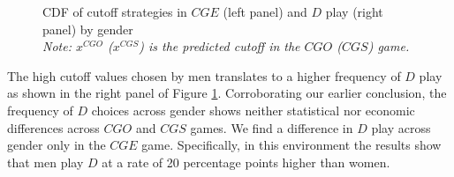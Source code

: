 \documentclass[11pt, letterpaper]{article}
\theoremstyle{plain}
\begin{document}
\begin{center}
\begin{figure}[ht]
\centering{}%
\begin{minipage}[t]{0.45\columnwidth}%
%
\end{minipage}%
\begin{minipage}[t]{0.45\columnwidth}%
%
\end{minipage} 
\caption{CDF of cutoff strategies in $CGE$ (left panel) and $D$ play (right panel) by gender\\ \footnotesize{\textit{Note: $x^{CGO}$ ($x^{CGS}$) is the predicted cutoff in the $CGO$ ($CGS$) game.}}}
\label{fig:cdfgender2}\end{figure}
\par\end{center}




The high cutoff values chosen by men translates to a higher frequency of $D$ play as shown in the right panel of Figure \ref{fig:cdfgender2}. Corroborating our earlier conclusion, the frequency of $D$ choices across gender shows neither statistical nor economic differences across $CGO$ and $CGS$ games. We find a difference in $D$ play across gender only in the $CGE$ game. Specifically, in this environment the results show that men play $D$ at a rate of 20 percentage points higher than women. 
\end{document}
